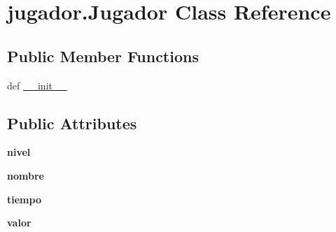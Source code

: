 \hypertarget{classjugador_1_1_jugador}{\section{jugador.\-Jugador Class Reference}
\label{classjugador_1_1_jugador}
}
\subsection*{Public Member Functions}
\begin{DoxyCompactItemize}
\item 
def \hyperlink{classjugador_1_1_jugador_acd76dd6cca15ff1d47a0516f24ed82a8}{\-\_\-\-\_\-init\-\_\-\-\_\-}
\end{DoxyCompactItemize}
\subsection*{Public Attributes}
\begin{DoxyCompactItemize}
\item 
\hypertarget{classjugador_1_1_jugador_a814299d846d18566c8ae46e5ce1d882c}{{\bfseries nivel}}\label{classjugador_1_1_jugador_a814299d846d18566c8ae46e5ce1d882c}

\item 
\hypertarget{classjugador_1_1_jugador_a1dbfc0544f5ccd6634c89ec8371ee334}{{\bfseries nombre}}\label{classjugador_1_1_jugador_a1dbfc0544f5ccd6634c89ec8371ee334}

\item 
\hypertarget{classjugador_1_1_jugador_abf922bf19bd357fa114e02540c74eac7}{{\bfseries tiempo}}\label{classjugador_1_1_jugador_abf922bf19bd357fa114e02540c74eac7}

\item 
\hypertarget{classjugador_1_1_jugador_adbac29c1b384134e07d2fafe2d38cf18}{{\bfseries valor}}\label{classjugador_1_1_jugador_adbac29c1b384134e07d2fafe2d38cf18}

\end{DoxyCompactItemize}


